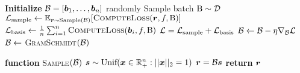 
\begin{algorithmic}[1]
\STATE \textbf{Initialize} $\mathcal{B} = [{{\bm{b}}}_1, \dots, {{\bm{b}}}_n]$ randomly
\STATE Sample batch $\text{B} \sim \mathcal{D}$
\STATE ${\mathcal{L}}_{\text{sample}} \leftarrow \mathbb{E}_{{{\bm{r}}} \sim \text{Sample}(\mathcal{B})}[\textsc{ComputeLoss}({{\bm{r}}}, f, \text{B})]$
\STATE ${\mathcal{L}}_{\text{basis}} \leftarrow \frac{1}{n}\sum_{i=1}^n \textsc{ComputeLoss}({{\bm{b}}}_i, f, \text{B})$
\STATE ${\mathcal{L}} = {\mathcal{L}}_{\text{sample}} + {\mathcal{L}}_{\text{basis}}$
\STATE $\mathcal{B} \leftarrow \mathcal{B} - \eta \nabla_{\mathcal{B}}{\mathcal{L}}$
\STATE $\mathcal{B} \leftarrow$ \textsc{GramSchmidt}$(\mathcal{B})$
\ENDWHILE
\end{algorithmic}
\vspace{1em}
\begin{algorithmic}[1]
\STATE \textbf{function} \textsc{Sample}$(\mathcal{B})$
\STATE \hspace*{1em} ${\bm{s}} \sim \text{Unif}({{\bm{x}} \in \mathbb{R}^n_+ : ||{\bm{x}}||_2 = 1})$
\STATE \hspace*{1em} ${{\bm{r}}} = \mathcal{B}{\bm{s}}$
\STATE \hspace*{1em} \textbf{return} ${{\bm{r}}}$
\end{algorithmic}
